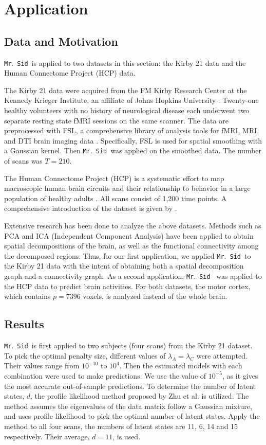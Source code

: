\documentclass[times,twocolumn,final,authoryear]{elsarticle}
\newcommand{\mrsid}{{\sc \texttt{Mr}.~\texttt{Sid}}}
\begin{document}
\section{Application}
\label{sec:application}

\subsection{Data and Motivation}
\mrsid~is applied to two datasets in this section: the Kirby 21 data and the Human Connectome Project (HCP) data.

The Kirby 21 data were acquired from the FM Kirby Research Center at the Kennedy Krieger Institute, an affiliate of Johns Hopkins University \citep{landman2011multi}. Twenty-one healthy volunteers with no history of neurological disease each underwent two separate resting state fMRI sessions on the same scanner. The data are preprocessed with FSL, a comprehensive library of analysis tools for fMRI, MRI, and DTI brain imaging data \citep{smith2004advances}. Specifically, FSL is used for spatial smoothing with a Gaussian kernel. Then \mrsid~was applied on the smoothed data.  The number of scans was $T = 210$.

The Human Connectome Project (HCP) is a systematic effort to map macroscopic human brain circuits and their relationship to behavior in a large population of healthy adults \citep{van2013wu,moeller2010multiband,feinberg2010multiplexed}. All scans consist of 1,200 time points. A comprehensive introduction of the dataset is given by \cite{van2013wu}.

Extensive research has been done to analyze the above datasets. Methods such as PCA and ICA (Independent Component Analysis) have been applied to obtain spatial decompositions of the brain, as well as the functional connectivity among the decomposed regions.  Thus, for our first application, we applied \mrsid~to the Kirby 21 data with the intent of obtaining both a spatial decomposition graph and a connectivity graph. As a second application, \mrsid~ was applied to the HCP data to predict brain activities. For both datasets, the motor cortex, which contains $p=7396$ voxels, is analyzed instead of the whole brain.
\subsection{Results}
\mrsid~is first applied to two subjects (four scans) from the Kirby 21 dataset. To pick the optimal penalty size, different values of  $\lambda_A = \lambda_C$ were attempted. Their values range from $10^{-10}$ to $10^{4}$. Then the estimated models with each combination were used to make predictions. We use the value of $10^{-5}$, as it gives the most accurate out-of-sample predictions. To determine the number of latent states, $d$, the profile likelihood method proposed by Zhu et al. \citep{zhu2006automatic} is utilized. The method assumes the eigenvalues of the data matrix follow a Gaussian mixture, and uses profile likelihood to pick the optimal number of latent states. Apply the method to all four scans, the numbers of latent states are 11, 6, 14 and 15 respectively. Their average, $d=11$, is used.
\end{document}
